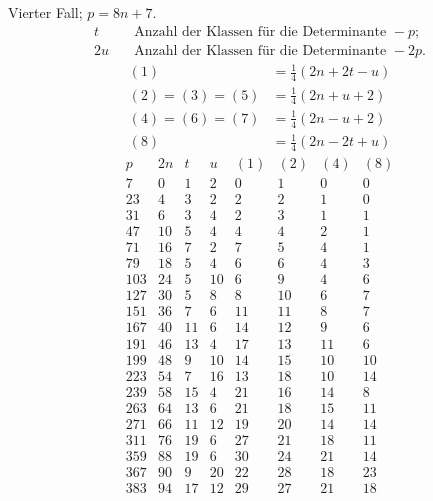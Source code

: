\clearpage
Vierter Fall; $p=8n+7$.
\[
\begin{aligned}
t&\quad\text{Anzahl der Klassen für die Determinante }-p;\\
2u&\quad\text{Anzahl der Klassen für die Determinante }-2p.
\end{aligned}
\]
\[
\begin{aligned}
(1)&=\tfrac14(2n+2t-u)\\
(2)=(3)=(5)&=\tfrac14(2n+u+2)\\
(4)=(6)=(7)&=\tfrac14(2n-u+2)\\
(8)&=\tfrac14(2n-2t+u)
\end{aligned}
\]
\[
\begin{array}{r|r|r|r|r|r|r|r}
p&2n&t&u&(1)&(2)&(4)&(8)\\\hline
7&0&1&2&0&1&0&0\\
23&4&3&2&2&2&1&0\\
31&6&3&4&2&3&1&1\\
47&10&5&4&4&4&2&1\\
71&16&7&2&7&5&4&1\\
79&18&5&4&6&6&4&3\\
103&24&5&10&6&9&4&6\\
127&30&5&8&8&10&6&7\\
151&36&7&6&11&11&8&7\\
167&40&11&6&14&12&9&6\\
191&46&13&4&17&13&11&6\\
199&48&9&10&14&15&10&10\\
223&54&7&16&13&18&10&14\\
239&58&15&4&21&16&14&8\\
263&64&13&6&21&18&15&11\\
271&66&11&12&19&20&14&14\\
311&76&19&6&27&21&18&11\\
359&88&19&6&30&24&21&14\\
367&90&9&20&22&28&18&23\\
383&94&17&12&29&27&21&18
\end{array}
\]
